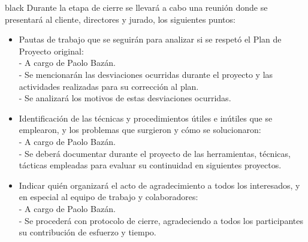 \documentclass[
11pt, %
codirector, %
]{charter}
\begin{document}
\begin{consigna}{black}
Durante la etapa de cierre se llevará a cabo una reunión donde se presentará al cliente, directores y jurado, los siguientes puntos:

\begin{itemize}
	\item Pautas de trabajo que se seguirán para analizar si se respetó el Plan de Proyecto original: \\
	 - A cargo de Paolo Bazán.  \\
	 - Se mencionarán las desviaciones ocurridas durante el proyecto y las actividades realizadas para su corrección al plan. \\
	 - Se analizará los motivos de estas desviaciones ocurridas. \\
	\item Identificación de las técnicas y procedimientos útiles e inútiles que se emplearon, y los problemas que surgieron y cómo se solucionaron: \\
	 - A cargo de Paolo Bazán.  \\
	 - Se deberá documentar durante el proyecto de las herramientas, técnicas, tácticas empleadas para evaluar su continuidad en siguientes proyectos. \\
	\item Indicar quién organizará el acto de agradecimiento a todos los interesados, y en especial al equipo de trabajo y colaboradores: \\
	 - A cargo de Paolo Bazán. \\
	 - Se procederá con protocolo de cierre, agradeciendo a todos los participantes su contribución de esfuerzo y tiempo. \\
\end{itemize}

\end{consigna}
\end{document}
